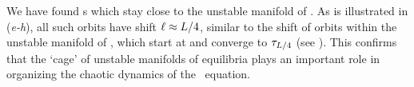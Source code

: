 
We have found \rpo s which stay
close to the unstable manifold of .
As is illustrated in (\textit{e-h}), all such orbits have
shift $\ell \approx L/4$, similar to the shift of orbits within
the unstable manifold of , which start at  and
converge to $\tau_{L/4}$ (see ). This
confirms that the `cage' of unstable manifolds of equilibria plays
an important role in organizing the chaotic dynamics of the \KS\
equation.



